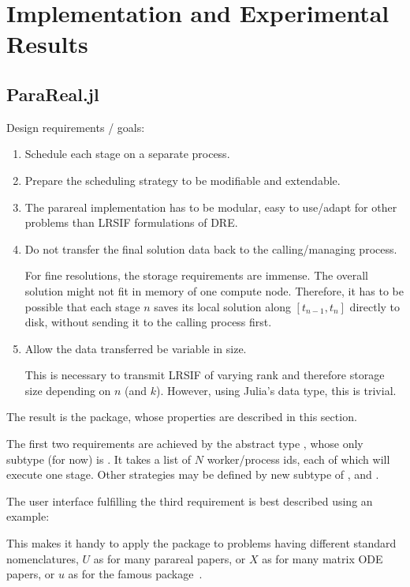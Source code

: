 \chapter{Implementation and Experimental Results}

\section{ParaReal.jl}

Design requirements / goals:
\begin{enumerate}
  \item
    Schedule each stage on a separate process.
  \item
    Prepare the scheduling strategy to be modifiable and extendable.
  \item
    The parareal implementation has to be modular,
    \ie easy to use/adapt for other problems than \ac{LRSIF} formulations of \ac{DRE}.
  \item
    Do not transfer the final solution data back to the calling/managing process.

    For fine resolutions, the storage requirements are immense.
    The overall solution might not fit in memory of one compute node.
    Therefore, it has to be possible that each stage $n$ saves its local solution along $[t_{n-1},t_n]$ directly to disk,
    without sending it to the calling process first.
  \item
    Allow the data transferred be variable in size.

    This is necessary to transmit \ac{LRSIF} of varying rank and therefore storage size depending on $n$ (and $k$).
    However, using Julia's  data type, this is trivial.
\end{enumerate}
The result is the  package,
whose properties are described in this section.

The first two requirements are achieved by the abstract type ,
whose only subtype (for now) is .
It takes a list of $N$ worker/process ids, each of which will execute one stage.
Other strategies may be defined by new subtype of ,
\eg {} and .

The user interface fulfilling the third requirement is best described using an example:


This makes it handy to apply the package to problems having different standard nomenclatures,
\eg $U$ as for many parareal papers, or
$X$ as for many matrix \ac{ODE} papers, or
$u$ as for the famous  package~\cite{DifferentialEquations}.

